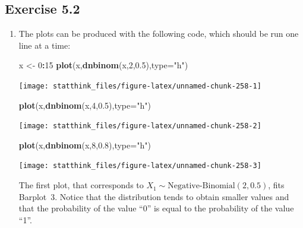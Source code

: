 \documentclass[]{krantz}
\makeatletter
\newenvironment{Shaded}{\begin{snugshade}}{\end{snugshade}}
\newcommand{\KeywordTok}[1]{\textcolor[rgb]{0.13,0.29,0.53}{\textbf{#1}}}
\newcommand{\DataTypeTok}[1]{\textcolor[rgb]{0.13,0.29,0.53}{#1}}
\newcommand{\DecValTok}[1]{\textcolor[rgb]{0.00,0.00,0.81}{#1}}
\newcommand{\FloatTok}[1]{\textcolor[rgb]{0.00,0.00,0.81}{#1}}
\newcommand{\StringTok}[1]{\textcolor[rgb]{0.31,0.60,0.02}{#1}}
\newcommand{\OperatorTok}[1]{\textcolor[rgb]{0.81,0.36,0.00}{\textbf{#1}}}
\newcommand{\NormalTok}[1]{#1}
\newenvironment{kframe}{%
\medskip{}
\setlength{\fboxsep}{.8em}
 \def\at@end@of@kframe{}%
 \ifinner\ifhmode%
  \def\at@end@of@kframe{\end{minipage}}%
  \begin{minipage}{\columnwidth}%
 \fi\fi%
 \def\FrameCommand##1{\hskip\@totalleftmargin \hskip-\fboxsep
 \colorbox{shadecolor}{##1}\hskip-\fboxsep
     \hskip-\linewidth \hskip-\@totalleftmargin \hskip\columnwidth}%
 \MakeFramed {\advance\hsize-\width
   \@totalleftmargin\z@ \linewidth\hsize
   \@setminipage}}%
 {\par\unskip\endMakeFramed%
 \at@end@of@kframe}
\renewenvironment{Shaded}{\begin{kframe}}{\end{kframe}}
\theoremstyle{definition}
\theoremstyle{definition}
\theoremstyle{definition}
\theoremstyle{remark}
\makeatother
\begin{document}
\subsection*{Exercise 5.2}\label{exercise-5.2}


\begin{enumerate}
\def\labelenumi{\arabic{enumi}.}
\item
  The plots can be produced with the following code, which should be run
  one line at a time:

\begin{Shaded}
\begin{Highlighting}[]
\NormalTok{x <-}\StringTok{ }\DecValTok{0}\OperatorTok{:}\DecValTok{15}
\KeywordTok{plot}\NormalTok{(x,}\KeywordTok{dnbinom}\NormalTok{(x,}\DecValTok{2}\NormalTok{,}\FloatTok{0.5}\NormalTok{),}\DataTypeTok{type=}\StringTok{"h"}\NormalTok{)}
\end{Highlighting}
\end{Shaded}

  \begin{center}\texttt{[image: statthink\_files/figure-latex/unnamed-chunk-258-1]} \end{center}

\begin{Shaded}
\begin{Highlighting}[]
\KeywordTok{plot}\NormalTok{(x,}\KeywordTok{dnbinom}\NormalTok{(x,}\DecValTok{4}\NormalTok{,}\FloatTok{0.5}\NormalTok{),}\DataTypeTok{type=}\StringTok{"h"}\NormalTok{)}
\end{Highlighting}
\end{Shaded}

  \begin{center}\texttt{[image: statthink\_files/figure-latex/unnamed-chunk-258-2]} \end{center}

\begin{Shaded}
\begin{Highlighting}[]
\KeywordTok{plot}\NormalTok{(x,}\KeywordTok{dnbinom}\NormalTok{(x,}\DecValTok{8}\NormalTok{,}\FloatTok{0.8}\NormalTok{),}\DataTypeTok{type=}\StringTok{"h"}\NormalTok{)}
\end{Highlighting}
\end{Shaded}

  \begin{center}\texttt{[image: statthink\_files/figure-latex/unnamed-chunk-258-3]} \end{center}

  The first plot, that corresponds to
  \(X_1 \sim \mbox{Negative-Binomial}(2,0.5)\), fits Barplot~3. Notice
  that the distribution tends to obtain smaller values and that the
  probability of the value ``0'' is equal to the probability of the
  value ``1''.


\end{enumerate}
\end{document}

